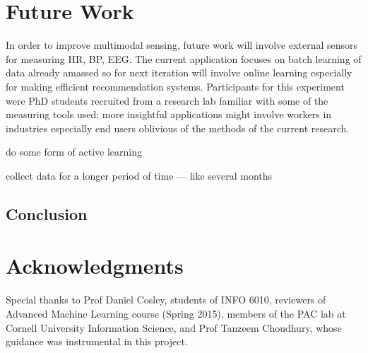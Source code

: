 \documentclass{article}
\begin{document}
\section{Future Work}
In order to improve multimodal sensing, future work will involve external sensors for measuring HR, BP, EEG. The current application focuses on batch learning of data already amassed so for next iteration will involve online learning especially for making efficient recommendation systems. Participants for this experiment were PhD students recruited from a research lab familiar with some of the measuring tools used; more insightful applications might involve workers in industries especially end users oblivious of the methods of the current research.

do some form of active learning

collect data for a longer period of time --- like several months


\subsection{Conclusion}

\section*{Acknowledgments} 
Special thanks to Prof Daniel Cosley, students of INFO 6010, reviewers of Advanced Machine Learning course (Spring 2015), members of the PAC lab at Cornell University Information Science, and Prof Tanzeem Choudhury, whose guidance was instrumental in this project. 




\end{document}
